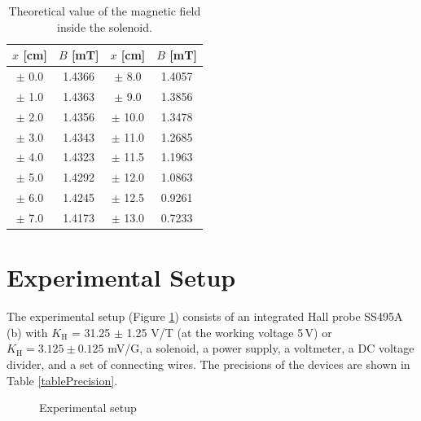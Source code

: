 \documentclass{article}
\begin{document}
\begin{table}[H]
\centering
\begin{tabular}{cc||cc}
\toprule
$x$ [cm] & $B$ [mT] & $x$ [cm] & $B$ [mT]\\
\hline
$\pm$ 0.0 & 1.4366 & $\pm$ 8.0 & 1.4057\\
$\pm$ 1.0 & 1.4363 & $\pm$ 9.0 & 1.3856\\
$\pm$ 2.0 & 1.4356 & $\pm$ 10.0 & 1.3478\\
$\pm$ 3.0 & 1.4343 & $\pm$ 11.0 & 1.2685\\
$\pm$ 4.0 & 1.4323 & $\pm$ 11.5 & 1.1963\\
$\pm$ 5.0 & 1.4292 & $\pm$ 12.0 & 1.0863\\
$\pm$ 6.0 & 1.4245 & $\pm$ 12.5 & 0.9261\\
$\pm$ 7.0 & 1.4173 & $\pm$ 13.0 & 0.7233\\
\bottomrule
\end{tabular}
 \caption{Theoretical value of the magnetic field inside the solenoid.}\label{TableTheoB}
\end{table}


		\section{Experimental Setup}

The experimental setup (Figure \ref{FigSetup}) consists of an integrated Hall probe SS495A (b) with $K_\text{H}$ = 31.25 $\pm$ 1.25 V/T (at the working voltage 5$\,$V) or $K_\text{H} = 3.125\pm0.125$ mV/G, a solenoid, a power supply, a voltmeter, a DC voltage divider, and a set of connecting wires. The precisions of the devices are shown in Table \ref{tablePrecision}.

\begin{figure}[H]
    \centering
         \caption{Experimental setup}
          \label{FigSetup}
\end{figure}
\end{document}
